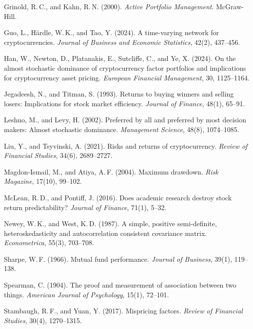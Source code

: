 \documentclass[11pt,a4paper]{article}
\begin{document}
\begin{flushleft}
\begin{enumerate}[label={[\arabic*]},leftmargin=1.6em,itemsep=4pt]
\item \label{ref:grinold-kahn-2000} Grinold, R.\,C., and Kahn, R.\,N. (2000). \textit{Active Portfolio Management}. McGraw-Hill.

\item \label{ref:guo-2024} Guo, L., H\"ardle, W.\,K., and Tao, Y. (2024). A time-varying network for cryptocurrencies. \textit{Journal of Business and Economic Statistics}, 42(2), 437--456.

\item \label{ref:han-2024} Han, W., Newton, D., Platanakis, E., Sutcliffe, C., and Ye, X. (2024). On the almost stochastic dominance of cryptocurrency factor portfolios and implications for cryptocurrency asset pricing. \textit{European Financial Management}, 30, 1125--1164.

\item \label{ref:jegadeesh-titman-1993} Jegadeesh, N., and Titman, S. (1993). Returns to buying winners and selling losers: Implications for stock market efficiency. \textit{Journal of Finance}, 48(1), 65--91.

\item \label{ref:leshno-levy-2002} Leshno, M., and Levy, H. (2002). Preferred by all and preferred by most decision makers: Almost stochastic dominance. \textit{Management Science}, 48(8), 1074--1085.

\item \label{ref:liu-tsyvinski-2021} Liu, Y., and Tsyvinski, A. (2021). Risks and returns of cryptocurrency. \textit{Review of Financial Studies}, 34(6), 2689--2727.

\item \label{ref:magdon-ismail-atiya-2004} Magdon-Ismail, M., and Atiya, A.\,F. (2004). Maximum drawdown. \textit{Risk Magazine}, 17(10), 99--102.

\item \label{ref:mclean-pontiff-2016} McLean, R.\,D., and Pontiff, J. (2016). Does academic research destroy stock return predictability? \textit{Journal of Finance}, 71(1), 5--32.

\item \label{ref:newey-west-1987} Newey, W.\,K., and West, K.\,D. (1987). A simple, positive semi-definite, heteroskedasticity and autocorrelation consistent covariance matrix. \textit{Econometrica}, 55(3), 703--708.

\item \label{ref:sharpe-1966} Sharpe, W.\,F. (1966). Mutual fund performance. \textit{Journal of Business}, 39(1), 119--138.

\item \label{ref:spearman-1904} Spearman, C. (1904). The proof and measurement of association between two things. \textit{American Journal of Psychology}, 15(1), 72--101.

\item \label{ref:stambaugh-yuan-2017} Stambaugh, R.\,F., and Yuan, Y. (2017). Mispricing factors. \textit{Review of Financial Studies}, 30(4), 1270--1315.

\end{enumerate}

\end{flushleft}
\end{document}
